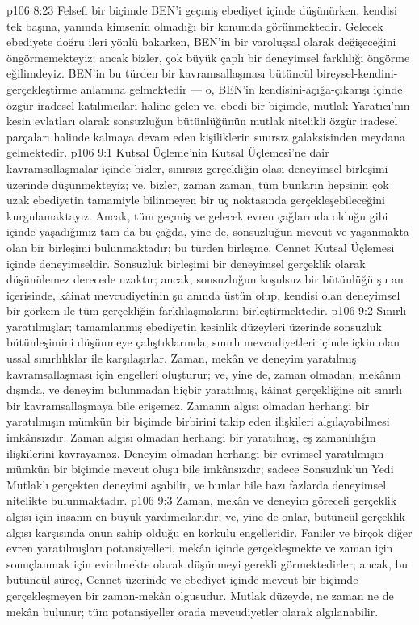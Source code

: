 \vs p106 8:23 Felsefi bir biçimde BEN’i geçmiş ebediyet içinde düşünürken, kendisi tek başına, yanında kimsenin olmadığı bir konumda görünmektedir. Gelecek ebediyete doğru ileri yönlü bakarken, BEN’in bir varoluşsal olarak değişeceğini öngörmemekteyiz; ancak bizler, çok büyük çaplı bir deneyimsel farklılığı öngörme eğilimdeyiz. BEN’in bu türden bir kavramsallaşması bütüncül bireysel\hyp{}kendini\hyp{}gerçekleştirme anlamına gelmektedir --- o, BEN’in kendisini\hyp{}açığa\hyp{}çıkarışı içinde özgür iradesel katılımcıları haline gelen ve, ebedi bir biçimde, mutlak Yaratıcı’nın kesin evlatları olarak sonsuzluğun bütünlüğünün mutlak nitelikli özgür iradesel parçaları halinde kalmaya devam eden kişiliklerin sınırsız galaksisinden meydana gelmektedir.
\vs p106 9:1 Kutsal Üçleme’nin Kutsal Üçlemesi’ne dair kavramsallaşmalar içinde bizler, sınırsız gerçekliğin olası deneyimsel birleşimi üzerinde düşünmekteyiz; ve, bizler, zaman zaman, tüm bunların hepsinin çok uzak ebediyetin tamamiyle bilinmeyen bir uç noktasında gerçekleşebileceğini kurgulamaktayız. Ancak, tüm geçmiş ve gelecek evren çağlarında olduğu gibi içinde yaşadığımız tam da bu çağda, yine de, sonsuzluğun mevcut ve yaşanmakta olan bir birleşimi bulunmaktadır; bu türden birleşme, Cennet Kutsal Üçlemesi içinde deneyimseldir. Sonsuzluk birleşimi bir deneyimsel gerçeklik olarak düşünülemez derecede uzaktır; ancak, sonsuzluğun koşulsuz bir bütünlüğü şu an içerisinde, kâinat mevcudiyetinin şu anında üstün olup, kendisi  olan deneyimsel bir görkem ile tüm gerçekliğin farklılaşmalarını birleştirmektedir.
\vs p106 9:2 Sınırlı yaratılmışlar; tamamlanmış ebediyetin kesinlik düzeyleri üzerinde sonsuzluk bütünleşimini düşünmeye çalıştıklarında, sınırlı mevcudiyetleri içinde içkin olan ussal sınırlılıklar ile karşılaşırlar. Zaman, mekân ve deneyim yaratılmış kavramsallaşması için engelleri oluşturur; ve, yine de, zaman olmadan, mekânın dışında, ve deneyim bulunmadan hiçbir yaratılmış, kâinat gerçekliğine ait sınırlı bir kavramsallaşmaya bile erişemez. Zamanın algısı olmadan herhangi bir yaratılmışın mümkün bir biçimde birbirini takip eden ilişkileri algılayabilmesi imkânsızdır. Zaman algısı olmadan herhangi bir yaratılmış, eş zamanlılığın ilişkilerini kavrayamaz. Deneyim olmadan herhangi bir evrimsel yaratılmışın mümkün bir biçimde mevcut oluşu bile imkânsızdır; sadece Sonsuzluk’un Yedi Mutlak’ı gerçekten deneyimi aşabilir, ve bunlar bile bazı fazlarda deneyimsel nitelikte bulunmaktadır.
\vs p106 9:3 Zaman, mekân ve deneyim göreceli gerçeklik algısı için insanın en büyük yardımcılarıdır; ve, yine de onlar, bütüncül gerçeklik algısı karşısında onun sahip olduğu en korkulu engelleridir. Faniler ve birçok diğer evren yaratılmışları potansiyelleri, mekân içinde gerçekleşmekte ve zaman için sonuçlanmak için evirilmekte olarak düşünmeyi gerekli görmektedirler; ancak, bu bütüncül süreç, Cennet üzerinde ve ebediyet içinde mevcut bir biçimde gerçekleşmeyen bir zaman\hyp{}mekân olgusudur. Mutlak düzeyde, ne zaman ne de mekân bulunur; tüm potansiyeller orada mevcudiyetler olarak algılanabilir.
